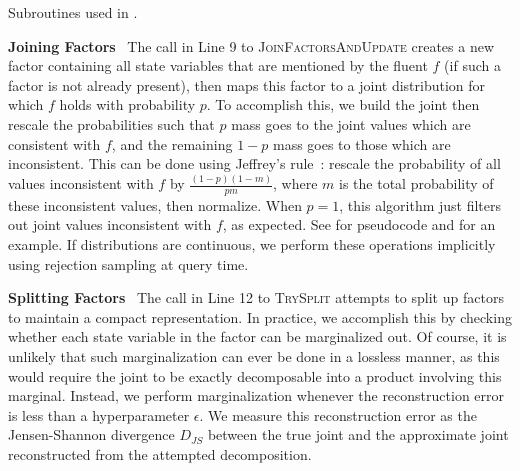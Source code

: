 \begin{algorithm}[t]
  \SetAlgoLined
  \SetAlgoNoEnd
  \DontPrintSemicolon
  \;

    \;
  \caption{Subroutines used in .}
\label{alg:subroutines}
\end{algorithm}

\textbf{Joining Factors} \ The call in Line 9 to
\textsc{JoinFactorsAndUpdate} creates a new factor containing all
state variables that are mentioned by the fluent $f$ (if such a factor
is not already present), then maps this factor to a joint distribution
for which $f$ holds with probability $p$. To accomplish this, we build
the joint then rescale the probabilities such that $p$ mass goes to
the joint values which are consistent with $f$, and the remaining
$1-p$ mass goes to those which are inconsistent. This can be done
using Jeffrey's rule~\cite{jeffreysrule}: rescale the probability of
all values inconsistent with $f$ by $\frac{(1-p)(1-m)}{pm}$, where $m$
is the total probability of these inconsistent values, then
normalize. When $p = 1$, this algorithm just filters out joint values
inconsistent with $f$, as expected. See  for
pseudocode and  for an example. If
distributions are continuous, we perform these operations implicitly
using rejection sampling at query time.

\textbf{Splitting Factors} \ The call in Line 12 to \textsc{TrySplit}
attempts to split up factors to maintain a compact representation. In
practice, we accomplish this by checking whether each state variable
in the factor can be marginalized out. Of course, it is unlikely that
such marginalization can ever be done in a lossless manner, as this
would require the joint to be exactly decomposable into a product
involving this marginal. Instead, we perform marginalization whenever
the reconstruction error is less than a hyperparameter $\epsilon$. We
measure this reconstruction error as the Jensen-Shannon divergence
$D_{JS}$ between the true joint and the approximate joint
reconstructed from the attempted decomposition.

